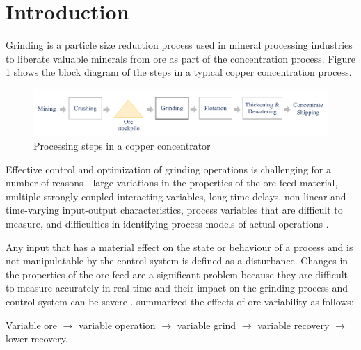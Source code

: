 \chapter*{Introduction}         %
\label{chap-introduction}       %


Grinding is a particle size reduction process used in mineral processing industries to liberate valuable minerals from ore as part of the concentration process. Figure \ref{fig:process-block-diagram} shows the block diagram of the steps in a typical copper concentration process.

\begin{figure}[htp]
	\centering
	\includegraphics[width=15.5cm]{images/process_block_diagram.pdf}
	\caption{Processing steps in a copper concentrator} \label{fig:process-block-diagram}
\end{figure}

Effective control and optimization of grinding operations is challenging for a number of reasons---large variations in the properties of the ore feed material, multiple strongly-coupled interacting variables, long time delays, non-linear and time-varying input-output characteristics, process variables that are difficult to measure, and difficulties in identifying process models of actual operations \citep{olivier_dual_2012, gough_sag_2015, le_roux_throughput_2016, aguila-camacho_control_2017}. 

Any input that has a material effect on the state or behaviour of a process and is not manipulatable by the control system is defined as a disturbance. Changes in the properties of the ore feed are a significant problem because they are difficult to measure accurately in real time and their impact on the grinding process and control system can be severe \citep{herbst_optimal_1988, garrido_multivariable_2009, remes_grinding_2010, liu_development_2018}. \cite{powell_applying_2009} summarized the effects of ore variability as follows:

Variable ore $\to$ variable operation $\to$ variable grind $\to$ variable recovery $\to$ lower recovery. 

